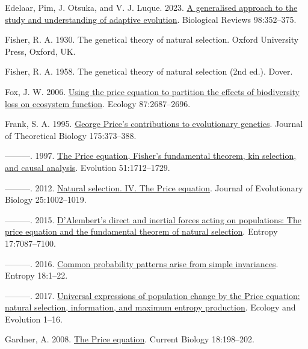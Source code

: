 \documentclass[
]{article}
\newlength{\cslhangindent}
\newenvironment{CSLReferences}[2] %
 {\begin{list}{}{%
  \setlength{\itemindent}{0pt}
  \setlength{\leftmargin}{0pt}
  \setlength{\parsep}{0pt}
  \ifodd #1
   \setlength{\leftmargin}{\cslhangindent}
   \setlength{\itemindent}{-1\cslhangindent}
  \fi
  \setlength{\itemsep}{#2\baselineskip}}}
 {\end{list}}
\begin{document}
\begin{CSLReferences}{0}{0}
Edelaar, Pim, J. Otsuka, and V. J. Luque. 2023.
\href{https://doi.org/10.1111/brv.12910}{{A generalised approach to the
study and understanding of adaptive evolution}}. Biological Reviews
98:352--375.

Fisher, R. A. 1930. The genetical theory of natural selection. Oxford
University Press, Oxford, UK.

Fisher, R. A. 1958. The genetical theory of natural selection (2nd ed.).
Dover.

Fox, J. W. 2006.
\href{https://doi.org/10.1890/0012-9658(2006)87\%5B2687:utpetp\%5D2.0.co;2}{{Using
the price equation to partition the effects of biodiversity loss on
ecosystem function}}. Ecology 87:2687--2696.

Frank, S. A. 1995. \href{https://doi.org/10.1006/jtbi.1995.0148}{{George
Price's contributions to evolutionary genetics}}. Journal of Theoretical
Biology 175:373--388.

---------. 1997.
\href{https://doi.org/10.1111/j.1558-5646.1997.tb05096.x}{{The Price
equation, Fisher's fundamental theorem, kin selection, and causal
analysis}}. Evolution 51:1712--1729.

---------. 2012.
\href{https://doi.org/10.1111/j.1420-9101.2012.02498.x}{{Natural
selection. IV. The Price equation}}. Journal of Evolutionary Biology
25:1002--1019.

---------. 2015. \href{https://doi.org/10.3390/e17107087}{{D'Alembert's
direct and inertial forces acting on populations: The price equation and
the fundamental theorem of natural selection}}. Entropy 17:7087--7100.

---------. 2016. \href{https://doi.org/10.3390/e18050192}{{Common
probability patterns arise from simple invariances}}. Entropy 18:1--22.

---------. 2017. \href{https://doi.org/10.1002/ece3.2922}{{Universal
expressions of population change by the Price equation: natural
selection, information, and maximum entropy production}}. Ecology and
Evolution 1--16.

Gardner, A. 2008. \href{https://doi.org/10.1016/j.cub.2008.01.005}{{The
Price equation}}. Current Biology 18:198--202.


\end{CSLReferences}
\end{document}
